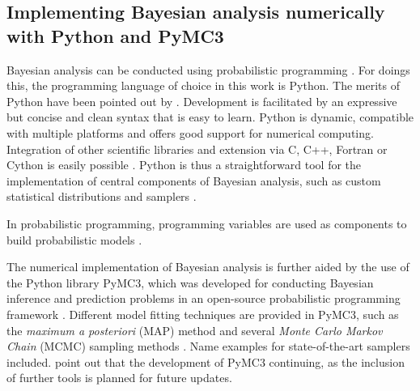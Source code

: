 		\subsection{Implementing Bayesian analysis numerically with Python and PyMC3}
		Bayesian analysis can be conducted using probabilistic programming \citep{salvatier2016pymc3}. For doings this, the programming language of choice in this work is Python. The merits of Python have been pointed out by \citet{behnel2010, salvatier2016pymc3, Langtangen2008}. Development is facilitated by an expressive but concise and clean syntax that is easy to learn. Python is dynamic, compatible with multiple platforms and offers good support for numerical computing. Integration of other scientific libraries and extension via C, C++, Fortran or Cython is easily possible \citep{behnel2010, salvatier2016pymc3, Langtangen2008}. Python is thus a straightforward tool for the implementation of central components of Bayesian analysis, such as custom statistical distributions and samplers \citep{salvatier2016pymc3}.
		
		In probabilistic programming, programming variables are used as components to build probabilistic models \citep{davidson2015}. 
		
		The numerical implementation of Bayesian analysis is further aided by the use of the Python library PyMC3, which was developed for conducting Bayesian inference and prediction problems in an open-source probabilistic programming framework \citep{davidson2015, salvatier2016pymc3}. Different model fitting techniques are provided in PyMC3, such as the \textit{maximum a posteriori} (MAP) method and several \textit{Monte Carlo Markov Chain} (MCMC) sampling methods \citep{salvatier2016pymc3}. 
		Name examples for state-of-the-art samplers included.
		\citet{salvatier2016pymc3} point out that the development of PyMC3 continuing, as the inclusion of further tools is planned for future updates.
		
